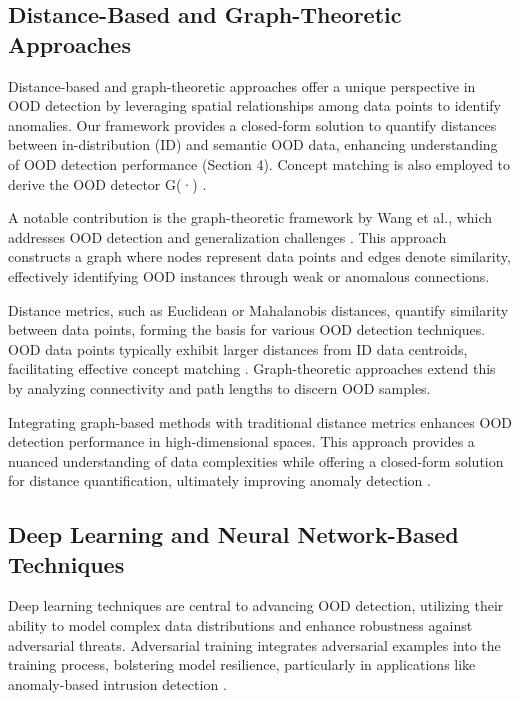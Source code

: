 \subsection{Distance-Based and Graph-Theoretic Approaches} \label{subsec:Distance-Based and Graph-Theoretic Approaches}

Distance-based and graph-theoretic approaches offer a unique perspective in OOD detection by leveraging spatial relationships among data points to identify anomalies. Our framework provides a closed-form solution to quantify distances between in-distribution (ID) and semantic OOD data, enhancing understanding of OOD detection performance (Section 4). Concept matching is also employed to derive the OOD detector G(·) \cite{wang2024bridgingooddetectiongeneralization,Delvingint2}.

A notable contribution is the graph-theoretic framework by Wang et al., which addresses OOD detection and generalization challenges \cite{wang2024bridgingooddetectiongeneralization}. This approach constructs a graph where nodes represent data points and edges denote similarity, effectively identifying OOD instances through weak or anomalous connections.

Distance metrics, such as Euclidean or Mahalanobis distances, quantify similarity between data points, forming the basis for various OOD detection techniques. OOD data points typically exhibit larger distances from ID data centroids, facilitating effective concept matching \cite{lang2023survey,Delvingint2}. Graph-theoretic approaches extend this by analyzing connectivity and path lengths to discern OOD samples.

Integrating graph-based methods with traditional distance metrics enhances OOD detection performance in high-dimensional spaces. This approach provides a nuanced understanding of data complexities while offering a closed-form solution for distance quantification, ultimately improving anomaly detection \cite{wang2024bridgingooddetectiongeneralization}.

\subsection{Deep Learning and Neural Network-Based Techniques} \label{subsec:Deep Learning and Neural Network-Based Techniques}

Deep learning techniques are central to advancing OOD detection, utilizing their ability to model complex data distributions and enhance robustness against adversarial threats. Adversarial training integrates adversarial examples into the training process, bolstering model resilience, particularly in applications like anomaly-based intrusion detection \cite{arous2023noiseyouadversarialtraining}.

